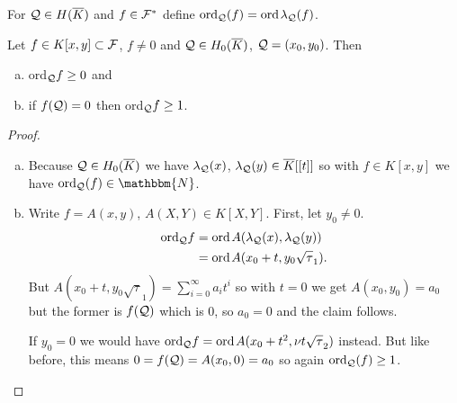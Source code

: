 \documentclass[english,11pt,a4paper]{article}
\begin{document}
\vspace{-3mm}
\fline
\vspace{-3mm}
\begin{defin}
   For $\mathcal{Q} \in H(\overline K)$ and $f \in \mathcal{F}^*$ define $\text{ord}_{\mathcal{Q}} (f) = \text{ord\hspace{0.4mm}} \lambda_{\mathcal{Q}} (f)$.
\end{defin}
\vspace{-5.5mm}
\fline


\begin{lemma}\label{one}
  Let $f \in K[x,y] \subset \mathcal{F}$, $f \neq 0$ and $\mathcal{Q} \in H_0(\overline K)$, $\mathcal{Q} = (x_0,y_0)$. Then
  \begin{enumerate}[(a)]\parskip 1mm
	  \item ord$_{\mathcal{Q}} f \geq 0$ and
	  \item if $f(\mathcal{Q}) = 0$ then ord$_{\mathcal{Q}} f \geq 1$.
	\end{enumerate}\parskip 3mm
	\begin{proof}\hfill
		\begin{enumerate}[(a)]\parskip 1mm
	  	\item Because $\mathcal{Q} \in H_0(\overline K)$ we have $\lambda_{\mathcal{Q}}(x)$, $\lambda_{\mathcal{Q}}(y) \in \overline K[[t]]$ so with $f \in K[x,y]$ we have $\ordq (f) \in \mathbbm{N}$.
	  	\item Write $f = A(x,y)$, $A(X,Y) \in K[X,Y]$. First, let $y_0 \neq 0$.
	  	\begin{align*}
	  	  \text{ord}_{\mathcal{Q}} f &= \text{ord\hspace{0.4mm}} A(\lambda_{\mathcal{Q}}(x), \lambda_{\mathcal{Q}}(y))\\
	  	  &= \text{ord\hspace{0.4mm}} A(x_0 + t, y_0 \sqrt \tau_1).
	  	\end{align*}
	  	But $A(x_0 + t, y_0 \sqrt \tau_1)=\sum_{i=0}^{\infty} a_i t^i$ so with $t=0$ we get $A(x_0, y_0)=a_0$ but the former is $f(\mathcal{Q})$ which is $0$, so $a_0 = 0$ and the claim follows.

	  	If $y_0 = 0$ we would have $\text{ord}_{\mathcal{Q}} f = \text{ord\hspace{0.4mm}} A(x_0 + t^2, \nu t \sqrt \tau_2)$ instead. But like before, this means $0 = f(\mathcal{Q}) = A(x_0, 0) = a_0$ so again $\text{ord}_{\mathcal{Q}} (f) \geq 1$.
		\end{enumerate}\parskip 3mm
	\end{proof}
\end{lemma}
\end{document}
